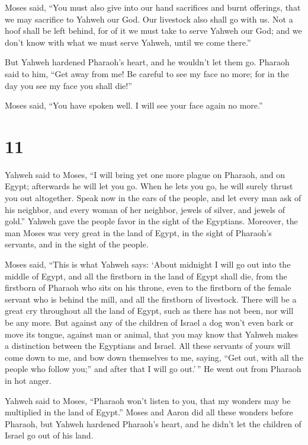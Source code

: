  Moses said, ``You must also give into our hand
sacrifices and burnt offerings, that we may sacrifice to Yahweh our God.
 Our livestock also shall go with us. Not a hoof shall be
left behind, for of it we must take to serve Yahweh our God; and we
don't know with what we must serve Yahweh, until we come there.''

 But Yahweh hardened Pharaoh's heart, and he wouldn't let
them go.  Pharaoh said to him, ``Get away from me! Be
careful to see my face no more; for in the day you see my face you shall
die!''

 Moses said, ``You have spoken well. I will see your face
again no more.''

\hypertarget{section-10}{%
\section{11}\label{section-10}}

 Yahweh said to Moses, ``I will bring yet one more plague
on Pharaoh, and on Egypt; afterwards he will let you go. When he lets
you go, he will surely thrust you out altogether.  Speak
now in the ears of the people, and let every man ask of his neighbor,
and every woman of her neighbor, jewels of silver, and jewels of gold.''
 Yahweh gave the people favor in the sight of the
Egyptians. Moreover, the man Moses was very great in the land of Egypt,
in the sight of Pharaoh's servants, and in the sight of the people.

 Moses said, ``This is what Yahweh says: `About midnight I
will go out into the middle of Egypt,  and all the
firstborn in the land of Egypt shall die, from the firstborn of Pharaoh
who sits on his throne, even to the firstborn of the female servant who
is behind the mill, and all the firstborn of livestock. 
There will be a great cry throughout all the land of Egypt, such as
there has not been, nor will be any more.  But against any
of the children of Israel a dog won't even bark or move its tongue,
against man or animal, that you may know that Yahweh makes a distinction
between the Egyptians and Israel.  All these servants of
yours will come down to me, and bow down themselves to me, saying, ``Get
out, with all the people who follow you;'' and after that I will go
out.'\,'' He went out from Pharaoh in hot anger.

 Yahweh said to Moses, ``Pharaoh won't listen to you, that
my wonders may be multiplied in the land of Egypt.'' 
Moses and Aaron did all these wonders before Pharaoh, but Yahweh
hardened Pharaoh's heart, and he didn't let the children of Israel go
out of his land.

